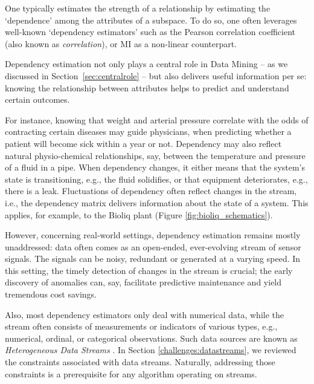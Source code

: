 One typically estimates the strength of a relationship by estimating the `dependence' among the attributes of a subspace. To do so, one often leverages well-known `dependency estimators' such as the Pearson correlation coefficient (also known as \textit{correlation}), or \gls{MI} \cite{DBLP:journals/bstj/Shannon48} as a non-linear counterpart. 

Dependency estimation not only plays a central role in Data Mining -- as we discussed in Section~\ref{sec:centralrole} -- but also delivers useful information per se: knowing the relationship between attributes helps to predict and understand certain outcomes. 

For instance, knowing that weight and arterial pressure correlate with the odds of contracting certain diseases may guide physicians, when predicting whether a patient will become sick within a year or not. Dependency may also reflect natural physio-chemical relationships, say, between the temperature and pressure of a fluid in a pipe. When dependency changes, it either means that the system's state is transitioning, e.g., the fluid solidifies, or that equipment deteriorates, e.g., there is a leak. Fluctuations of dependency often reflect changes in the stream, i.e., the dependency matrix delivers information about the state of a system. This applies, for example, to the \gls{Bioliq} plant (Figure \ref{fig:bioliq_schematics}). 

However, concerning real-world settings, dependency estimation remains mostly unaddressed: data often comes as an open-ended, ever-evolving stream of sensor signals. The signals can be noisy, redundant or generated at a varying speed. In this setting, the timely detection of changes in the stream is crucial; the early discovery of anomalies can, say, facilitate predictive maintenance and yield tremendous cost savings.

Also, most dependency estimators only deal with numerical data, while the stream often consists of measurements or indicators of various types, e.g., numerical, ordinal, or categorical observations. Such data sources are known as \textit{Heterogeneous Data Streams} \cite{DBLP:conf/icdm/YangZ06}. In Section \ref{challenges:datastreams}, we reviewed the constraints associated with data streams. Naturally, addressing those constraints is a prerequisite for any algorithm operating on streams. 

